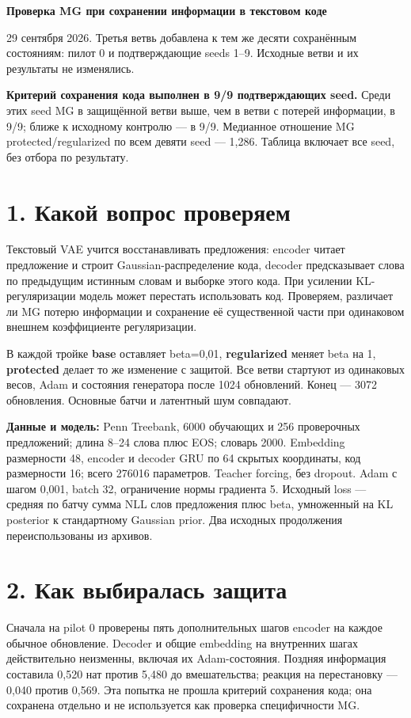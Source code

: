 \documentclass[10pt,a4paper]{article}
\begin{document}
{\Large\bfseries Проверка MG при сохранении информации в текстовом коде}\par\medskip

29 сентября 2026. Третья ветвь добавлена к тем же десяти сохранённым состояниям: пилот 0 и подтверждающие seeds 1--9. Исходные ветви и их результаты не изменялись.

\textbf{Критерий сохранения кода выполнен в 9/9 подтверждающих seed.} Среди этих seed MG в защищённой ветви выше, чем в ветви с потерей информации, в 9/9; ближе к исходному контролю --- в 9/9. Медианное отношение MG protected/regularized по всем девяти seed --- 1,286. Таблица включает все seed, без отбора по результату.

\section*{1. Какой вопрос проверяем}

Текстовый VAE учится восстанавливать предложения: encoder читает предложение и строит Gaussian-распределение кода, decoder предсказывает слова по предыдущим истинным словам и выборке этого кода. При усилении KL-регуляризации модель может перестать использовать код. Проверяем, различает ли MG потерю информации и сохранение её существенной части при одинаковом внешнем коэффициенте регуляризации.

В каждой тройке \textbf{base} оставляет beta=0,01, \textbf{regularized} меняет beta на 1, \textbf{protected} делает то же изменение с защитой. Все ветви стартуют из одинаковых весов, Adam и состояния генератора после 1024 обновлений. Конец --- 3072 обновления. Основные батчи и латентный шум совпадают.

\textbf{Данные и модель:} Penn Treebank, 6000 обучающих и 256 проверочных предложений; длина 8--24 слова плюс EOS; словарь 2000. Embedding размерности 48, encoder и decoder GRU по 64 скрытых координаты, код размерности 16; всего 276016 параметров. Teacher forcing, без dropout. Adam с шагом 0,001, batch 32, ограничение нормы градиента 5. Исходный loss --- средняя по батчу сумма NLL слов предложения плюс beta, умноженный на KL posterior к стандартному Gaussian prior. Два исходных продолжения переиспользованы из архивов.

\section*{2. Как выбиралась защита}

Сначала на pilot 0 проверены пять дополнительных шагов encoder на каждое обычное обновление. Decoder и общие embedding на внутренних шагах действительно неизменны, включая их Adam-состояния. Поздняя информация составила 0,520 нат против 5,480 до вмешательства; реакция на перестановку --- 0,040 против 0,569. Эта попытка не прошла критерий сохранения кода; она сохранена отдельно и не используется как проверка специфичности MG.
\end{document}
